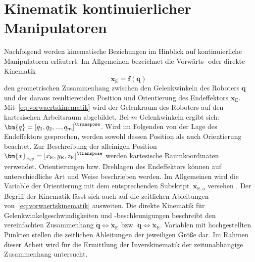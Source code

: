 \pagebreak
\section{Kinematik kontinuierlicher Manipulatoren}
\label{sec:kinematik_allgemein}

Nachfolgend werden kinematische Beziehungen im Hinblick auf kontinuierliche Manipulatoren erläutert. Im Allgemeinen bezeichnet die Vorwärts- oder direkte Kinematik 
%
\begin{equation}
\label{eq:vorwaertskinematik}
\bm{x}_\mathrm{E} = \bm{f}(\bm{q}) 
\end{equation}
%
den geometrischen Zusammenhang zwischen den Gelenkwinkeln des Roboters $\bm{q}$ und der daraus resultierenden Position und Orientierung des Endeffektors $\bm{x}_\mathrm{E}$. Mit~\eqref{eq:vorwaertskinematik} wird der Gelenkraum des Roboters auf den kartesischen Arbeitsraum abgebildet. Bei $m$ Gelenkwinkeln ergibt sich:
$\bm{q} = \left[q_1, q_2, ..., q_m \right]^\transpose$. 
Wird im Folgenden von der Lage des Endeffektors gesprochen, werden sowohl dessen Position als auch Orientierung beachtet. 
Zur Beschreibung der alleinigen Position~$\bm{x}_{\mathrm{E,p}} = \left[ x_\mathrm{E}, y_\mathrm{E}, z_\mathrm{E} \right]^\transpose$ werden kartesische Raumkoordinaten verwendet.
Orientierungen bzw. Drehlagen des Endeffektors können auf unterschiedliche Art und Weise beschrieben werden. Im Allgemeinen wird die Variable der Orientierung mit dem entsprechenden Subskript~$\bm{x}_{\mathrm{E,o}}$ versehen .
Der Begriff der Kinematik lässt sich auch auf die zeitlichen Ableitungen von~\eqref{eq:vorwaertskinematik} ausweiten. Die direkte Kinematik für Gelenkwinkelgeschwindigkeiten und -beschleunigungen beschreibt den vereinfachten Zusammenhang \mbox{$\bm{\dot{q}} \Leftrightarrow \bm{\dot{x}}_\mathrm{E}$} bzw. \mbox{$\bm{\ddot{q}} \Leftrightarrow \bm{\ddot{x}}_\mathrm{E}$}. Variablen mit hochgestellten Punkten stellen die zeitlichen Ableitungen der jeweiligen Größe dar. 
Im Rahmen dieser Arbeit wird für die Ermittlung der Inverskinematik der zeitunabhängige Zusammenhang untersucht. 

